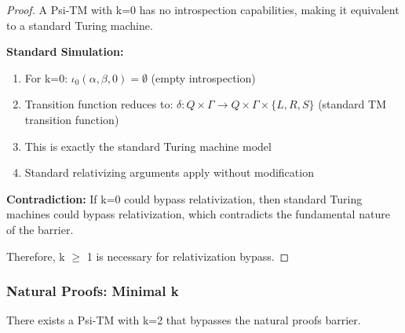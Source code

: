 \documentclass[11pt]{article}
\begin{document}
\begin{proof}
A Psi-TM with k=0 has no introspection capabilities, making it equivalent to a standard Turing machine.

\textbf{Standard Simulation:}
\begin{enumerate}
\item For k=0: $\iota_0(\alpha, \beta, 0) = \emptyset$ (empty introspection)
\item Transition function reduces to: $\delta: Q \times \Gamma \to Q \times \Gamma \times \{L, R, S\}$ (standard TM transition function)
\item This is exactly the standard Turing machine model
\item Standard relativizing arguments apply without modification
\end{enumerate}

\textbf{Contradiction:} If k=0 could bypass relativization, then standard Turing machines could bypass relativization, which contradicts the fundamental nature of the barrier.

Therefore, k $\geq$ 1 is necessary for relativization bypass.
\end{proof}

\subsubsection{Natural Proofs: Minimal k}

\begin{theorem}[Natural Proofs Bypass with k=2]
\label{thm:natural-proofs-k2}
There exists a Psi-TM with k=2 that bypasses the natural proofs barrier.
\end{theorem}
\end{document}
